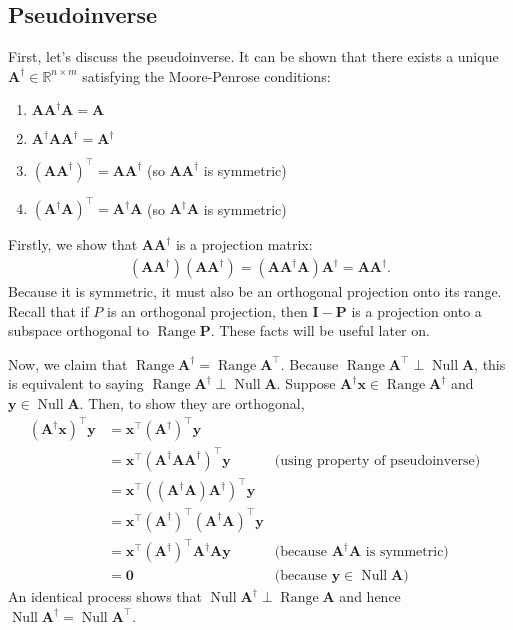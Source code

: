 \documentclass[12pt,a4paper]{article} %
\DeclareMathOperator{\Range}{Range}
\DeclareMathOperator{\Null}{Null}
\begin{document}
\subsection{Pseudoinverse}
First, let's discuss the pseudoinverse.
It can be shown that there exists a unique $\mathbf A^\dagger \in \mathbb R^{n \times m}$ satisfying the Moore-Penrose conditions:
\begin{enumerate}
    \item $\mathbf A \mathbf A^\dagger \mathbf A = \mathbf A$
    \item $\mathbf A^\dagger \mathbf A \mathbf A^\dagger = \mathbf A^\dagger$
    \item $(\mathbf A \mathbf A^\dagger)^\top = \mathbf A \mathbf A^\dagger$ (so $\mathbf A \mathbf A^\dagger$ is symmetric)
    \item $(\mathbf A^\dagger \mathbf A)^\top = \mathbf A^\dagger \mathbf A$ (so $\mathbf A^\dagger \mathbf A$ is symmetric)
\end{enumerate}
Firstly, we show that $\mathbf A \mathbf A^\dagger$ is a projection matrix:
\begin{align*}
    (\mathbf A \mathbf A^\dagger) (\mathbf A \mathbf A^\dagger) = (\mathbf A \mathbf A^\dagger \mathbf A) \mathbf A^\dagger = \mathbf A \mathbf A^\dagger.
\end{align*}
Because it is symmetric, it must also be an orthogonal projection onto its range.
Recall that if $P$ is an orthogonal projection, then $\mathbf I - \mathbf P$ is a projection onto a 
subspace orthogonal to $\Range \mathbf P$. These facts will be useful later on.

Now, we claim that $\Range \mathbf A^\dagger = \Range \mathbf A^\top$. Because $\Range \mathbf A^\top \perp \Null \mathbf A$, this is 
equivalent to saying $\Range \mathbf A^\dagger \perp \Null \mathbf A$. Suppose $\mathbf A^\dagger \bm x \in \Range \mathbf A^\dagger$ and $\bm y \in \Null \mathbf A$. Then,
to show they are orthogonal,
\begin{align*}
    (\mathbf A^\dagger \bm x)^\top \bm y &= \bm x^\top (\mathbf A^\dagger)^\top \bm y \\ 
    &= \bm x^\top (\mathbf A^\dagger \mathbf A\mathbf A^\dagger)^\top \bm y& \text{(using property of pseudoinverse)}&\\ 
    &= \bm x^\top ((\mathbf A^\dagger \mathbf A)\mathbf A^\dagger)^\top \bm y \\ 
    &= \bm x^\top (\mathbf A^\dagger)^\top (\mathbf A^\dagger\mathbf A)^\top \bm y \\ 
    &= \bm x^\top  (\mathbf A^\dagger)^\top \mathbf A^\dagger\mathbf A \bm y & \text{(because $\mathbf A^\dagger \mathbf A$ is symmetric)}\\ 
    &= \bm 0 & \text{(because $\bm y \in \Null \mathbf A$)}
\end{align*}
An identical process shows that $\Null \mathbf A^\dagger \perp \Range \mathbf A$ and hence
$\Null \mathbf A^\dagger = \Null \mathbf A^\top$.
\end{document}
